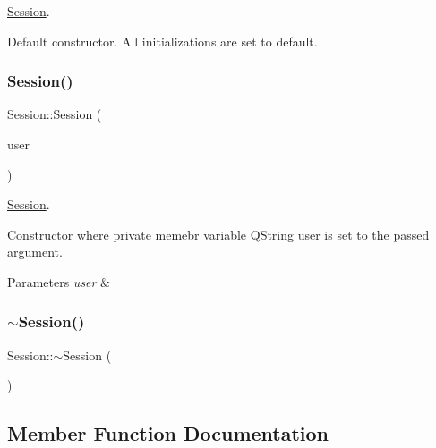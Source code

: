 \hyperlink{class_session}{Session}. 

Default constructor. All initializations are set to default. \mbox{\label{class_session_a0a7362dd58b94a67af892eb2cda1082a}} 
\subsubsection{\texorpdfstring{Session()}{Session()}\hspace{0.1cm}{\footnotesize\ttfamily [2/2]}}
{\footnotesize\ttfamily Session\+::\+Session (\begin{DoxyParamCaption}\item[{Q\+String}]{user }\end{DoxyParamCaption})}



\hyperlink{class_session}{Session}. 

Constructor where private memebr variable Q\+String user is set to the passed argument. 
\begin{DoxyParams}{Parameters}
{\em user} & \\
\hline
\end{DoxyParams}
\mbox{\label{class_session_a8753bb9dee966b7d39abc9b7237cd665}} 
\subsubsection{\texorpdfstring{$\sim$\+Session()}{~Session()}}
{\footnotesize\ttfamily Session\+::$\sim$\+Session (\begin{DoxyParamCaption}{ }\end{DoxyParamCaption})}



\subsection{Member Function Documentation}
\mbox{\label{class_session_a195911688579c457cf7e71c29ded7489}} 
